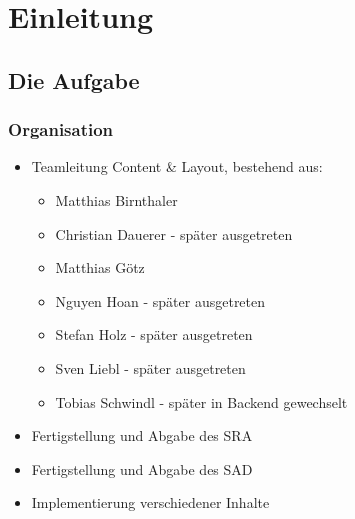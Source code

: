 \section{Einleitung} %
\subsection{Die Aufgabe} %

\begin{frame} 
	\frametitle{Organisation}
	
	\begin{itemize}
		\item Teamleitung Content \& Layout, bestehend aus:
		\begin{itemize}
			\item Matthias Birnthaler
			\item Christian Dauerer - später ausgetreten
			\item Matthias Götz
			\item Nguyen Hoan - später ausgetreten
			\item Stefan Holz - später ausgetreten
			\item Sven Liebl - später ausgetreten
			\item Tobias Schwindl - später in Backend gewechselt
		\end{itemize}
		
		\item Fertigstellung und Abgabe des SRA
		\item Fertigstellung und Abgabe des SAD
		\item Implementierung verschiedener Inhalte
	\end{itemize}

\end{frame}
